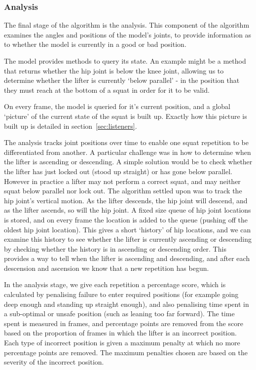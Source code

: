 \subsubsection{Analysis}

The final stage of the algorithm is the analysis. This component of the algorithm examines the angles and positions of the model's joints, to provide information as to whether the model is currently in a good or bad position.

The model provides methods to query its state. An example might be a method that returns whether the hip joint is below the knee joint, allowing us to determine whether the lifter is currently `below parallel' - in the position that they must reach at the bottom of a squat in order for it to be valid. 

On every frame, the model is queried for it's current position, and a global `picture' of the current state of the squat is built up. Exactly how this picture is built up is detailed in section~\ref{sec:listeners}.

The analysis tracks joint positions over time to enable one squat repetition to be differentiated from another. A particular challenge was in how to determine when the lifter is ascending or descending. A simple solution would be to check whether the lifter has just locked out (stood up straight) or has gone below parallel. However in practice a lifter may not perform a correct squat, and may neither squat below parallel nor lock out. The algorithm settled upon was to track the hip joint's vertical motion. As the lifter descends, the hip joint will descend, and as the lifter ascends, so will the hip joint. A fixed size queue of hip joint locations is stored, and on every frame the location is added to the queue (pushing off the oldest hip joint location). This gives a short `history' of hip locations, and we can examine this history to see whether the lifter is currently ascending or descending by checking whether the history is in ascending or descending order. This provides a way to tell when the lifter is ascending and descending, and after each descension and ascension we know that a new repetition has begun.

In the analysis stage, we give each repetition a percentage score, which is calculated by penalising failure to enter required positions (for example going deep enough and standing up straight enough), and also penalising time spent in a sub-optimal or unsafe position (such as leaning too far forward). The time spent is measured in frames, and percentage points are removed from the score based on the proportion of frames in which the lifter is an incorrect position. Each type of incorrect position is given a maximum penalty at which no more percentage points are removed. The maximum penalties chosen are based on the severity of the incorrect position.


